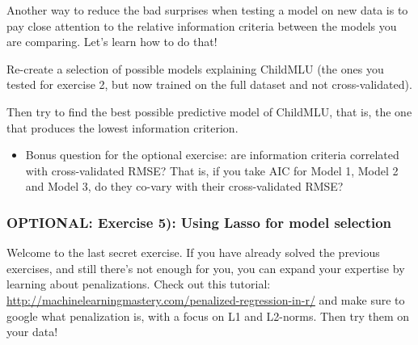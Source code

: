 \documentclass[]{article}
\providecommand{\tightlist}{%
  \setlength{\itemsep}{0pt}\setlength{\parskip}{0pt}}
\begin{document}
Another way to reduce the bad surprises when testing a model on new data
is to pay close attention to the relative information criteria between
the models you are comparing. Let's learn how to do that!

Re-create a selection of possible models explaining ChildMLU (the ones
you tested for exercise 2, but now trained on the full dataset and not
cross-validated).

Then try to find the best possible predictive model of ChildMLU, that
is, the one that produces the lowest information criterion.

\begin{itemize}
\tightlist
\item
  Bonus question for the optional exercise: are information criteria
  correlated with cross-validated RMSE? That is, if you take AIC for
  Model 1, Model 2 and Model 3, do they co-vary with their
  cross-validated RMSE?
\end{itemize}

\subsubsection{OPTIONAL: Exercise 5): Using Lasso for model
selection}\label{optional-exercise-5-using-lasso-for-model-selection}

Welcome to the last secret exercise. If you have already solved the
previous exercises, and still there's not enough for you, you can expand
your expertise by learning about penalizations. Check out this tutorial:
\url{http://machinelearningmastery.com/penalized-regression-in-r/} and
make sure to google what penalization is, with a focus on L1 and
L2-norms. Then try them on your data!
\end{document}
